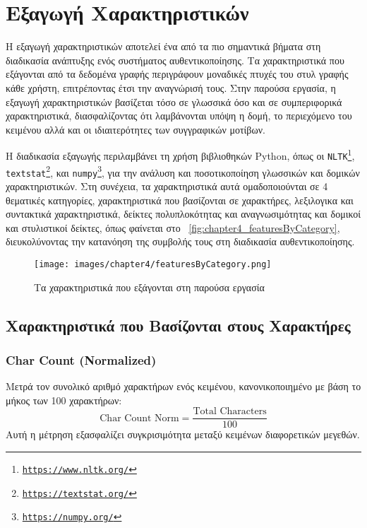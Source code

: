 \section{Εξαγωγή Χαρακτηριστικών}
\label{sec:implementation_features}

Η εξαγωγή χαρακτηριστικών αποτελεί ένα από τα πιο σημαντικά βήματα στη διαδικασία ανάπτυξης ενός συστήματος αυθεντικοποίησης. Τα χαρακτηριστικά που εξάγονται από τα δεδομένα γραφής περιγράφουν μοναδικές πτυχές του στυλ γραφής κάθε χρήστη, επιτρέποντας έτσι την αναγνώρισή τους. Στην παρούσα εργασία, η εξαγωγή χαρακτηριστικών βασίζεται τόσο σε γλωσσικά όσο και σε συμπεριφορικά χαρακτηριστικά, διασφαλίζοντας ότι λαμβάνονται υπόψη η δομή, το περιεχόμενο του κειμένου αλλά και οι ιδιαιτερότητες των συγγραφικών μοτίβων.

Η διαδικασία εξαγωγής περιλαμβάνει τη χρήση βιβλιοθηκών Python, όπως οι \texttt{NLTK\footnote{\url{https://www.nltk.org/}}}, \texttt{textstat\footnote{\url{https://textstat.org/}}}, και \texttt{numpy\footnote{\url{https://numpy.org/}}}, για την ανάλυση και ποσοτικοποίηση γλωσσικών και δομικών χαρακτηριστικών. Στη συνέχεια, τα χαρακτηριστικά αυτά ομαδοποιούνται σε 4 θεματικές κατηγορίες, χαρακτηριστικά που βασίζονται σε χαρακτήρες, λεξιλογικα και συντακτικά χαρακτηριστικά, δείκτες πολυπλοκότητας και αναγνωσιμότητας και δομικοί και στυλιστικοί δείκτες, όπως φαίνεται στο ~\autoref{fig:chapter4_featuresByCategory}, διευκολύνοντας την κατανόηση της συμβολής τους στη διαδικασία αυθεντικοποίησης.

\begin{figure}[H]
    \centering
    \texttt{[image: images/chapter4/featuresByCategory.png]}
    \caption{Τα χαρακτηριστικά που εξάγονται στη παρούσα εργασία}
    \label{fig:chapter4_featuresByCategory}
\end{figure}

\subsection{Χαρακτηριστικά που Βασίζονται στους Χαρακτήρες}

\subsubsection{Char Count (Normalized)}

Μετρά τον συνολικό αριθμό χαρακτήρων ενός κειμένου, κανονικοποιημένο με βάση το μήκος των 100 χαρακτήρων:
\[
\text{Char Count Norm} = \frac{\text{Total Characters}}{100}
\]
Αυτή η μέτρηση εξασφαλίζει συγκρισιμότητα μεταξύ κειμένων διαφορετικών μεγεθών.

